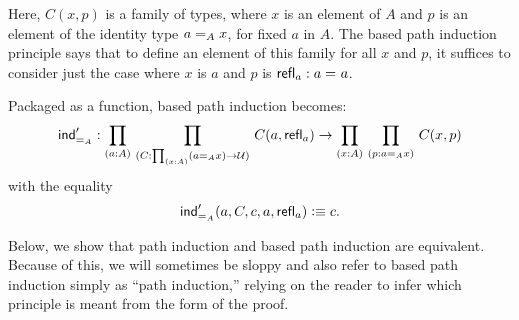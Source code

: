 Here, $C(x,p)$ is a family of types, where $x$ is an element of $A$ and $p$ is an element of the identity type $\id[A]{a}{x}$, for fixed $a$ in $A$. The based path induction principle says that to define an element of this family for all $x$ and $p$, it suffices to consider
just the case where $x$ is $a$ and $p$ is $\refl{a} : \id{a}{a}$.

Packaged as a function, based path induction becomes:
%
\begin{align*}
  \indidb{A} :  \dprd{a:A}{C : \prd{x:A} (\id[A]{a}{x}) \to \UU}
  C(a,\refl{a}) \to \dprd{x:A}{p : \id[A]{a}{x}} C(x,p) 
\end{align*}
with the equality
\[ \indidb{A}(a,C,c,a,\refl{a}) \defeq c. \]

Below, we show that path induction and based path induction are equivalent.  Because of this, we will sometimes be sloppy and also refer to based path induction simply as ``path induction,'' relying on the reader to infer which principle is meant from the form of the proof.  

